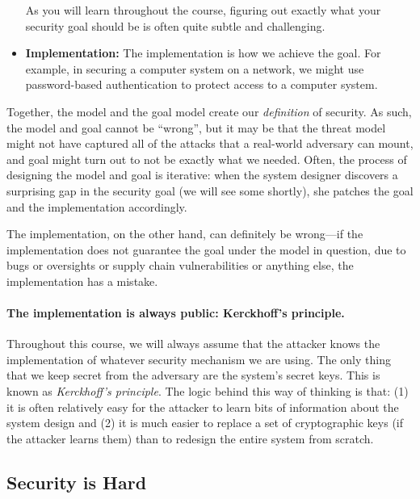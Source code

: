 \begin{itemize}
    As you will learn throughout the course, figuring out exactly what your
    security goal should be is often quite subtle and challenging.

  \item \textbf{Implementation:}
    The implementation is how we achieve the goal.
    For example, in securing a computer system on a network, we 
    might use password-based authentication to protect access to a computer system.
\end{itemize}

Together, the model and the goal model create our
\textit{definition} of security.
As such, the model and goal
cannot be ``wrong'', but it may be that
the threat model might not have captured all of
the attacks that a real-world adversary can mount,
and goal might turn out to
not be exactly what we needed.
Often, the process of designing the model and goal is iterative:
when the system designer discovers a surprising gap in the security
goal (we will see some shortly), she patches the goal and the implementation
accordingly.

The implementation, on the other hand, can definitely be wrong---if 
the implementation does not guarantee the goal
under the model in question, due to bugs or
oversights or supply chain vulnerabilities or
anything else, the implementation has a mistake.

\paragraph{The implementation is always public: Kerckhoff's principle.}
Throughout this course, we will always assume that the attacker knows
the implementation of whatever security mechanism we are using.
The only thing that we keep secret from the adversary are the system's
secret keys.
This is known as \emph{Kerckhoff's principle}.
The logic behind this way of thinking is that: (1) it is often
relatively easy for the attacker to learn bits of information 
about the system design and (2) it is much easier to replace
a set of cryptographic keys (if the attacker learns them) than
to redesign the entire system from scratch.


\subsection{Security is Hard}

